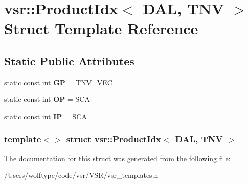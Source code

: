 \hypertarget{structvsr_1_1_product_idx_3_01_d_a_l_00_01_t_n_v_01_4}{\section{vsr\-:\-:Product\-Idx$<$ D\-A\-L, T\-N\-V $>$ Struct Template Reference}
\label{structvsr_1_1_product_idx_3_01_d_a_l_00_01_t_n_v_01_4}
}
\subsection*{Static Public Attributes}
\begin{DoxyCompactItemize}
\item 
\hypertarget{structvsr_1_1_product_idx_3_01_d_a_l_00_01_t_n_v_01_4_a43fa68858e9c30e99d8ed709e96ea87b}{static const int {\bfseries G\-P} = T\-N\-V\-\_\-\-V\-E\-C}\label{structvsr_1_1_product_idx_3_01_d_a_l_00_01_t_n_v_01_4_a43fa68858e9c30e99d8ed709e96ea87b}

\item 
\hypertarget{structvsr_1_1_product_idx_3_01_d_a_l_00_01_t_n_v_01_4_a652502ce08868b3b347f3636334296f6}{static const int {\bfseries O\-P} = S\-C\-A}\label{structvsr_1_1_product_idx_3_01_d_a_l_00_01_t_n_v_01_4_a652502ce08868b3b347f3636334296f6}

\item 
\hypertarget{structvsr_1_1_product_idx_3_01_d_a_l_00_01_t_n_v_01_4_af9499f3643f7b3fd1406d54bcb0912e6}{static const int {\bfseries I\-P} = S\-C\-A}\label{structvsr_1_1_product_idx_3_01_d_a_l_00_01_t_n_v_01_4_af9499f3643f7b3fd1406d54bcb0912e6}

\end{DoxyCompactItemize}
\subsubsection*{template$<$$>$ struct vsr\-::\-Product\-Idx$<$ D\-A\-L, T\-N\-V $>$}



The documentation for this struct was generated from the following file\-:\begin{DoxyCompactItemize}
\item 
/\-Users/wolftype/code/vsr/\-V\-S\-R/vsr\-\_\-templates.\-h\end{DoxyCompactItemize}

